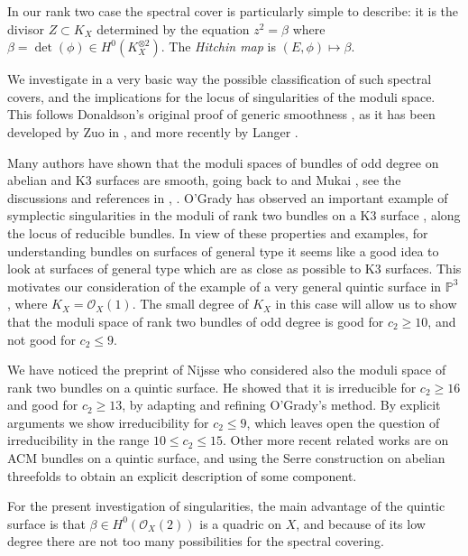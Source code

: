 \documentclass{amsart}
\theoremstyle{plain}
\numberwithin{equation}{section}
\begin{document}
In our rank two case the spectral cover is
particularly simple to describe: it is the divisor $Z\subset K_X$ determined by the
equation $z^2 = \beta$ where $\beta = \det (\phi )\in H^0(K_X^{\otimes 2})$. 
The {\em Hitchin map} is $(E,\phi )\mapsto \beta$. 

We investigate in a very basic way the possible classification of such spectral covers,
and the implications for the locus of singularities of the moduli space. This follows
Donaldson's original proof of generic smoothness \cite{Donaldson}, as it has been
developed by Zuo in \cite{Zuo}, and more recently by Langer \cite{Langer}. 

Many authors have shown that the moduli spaces of bundles of odd degree on
abelian and K3 surfaces are smooth, going back to \cite{ElencwajgForster} and
Mukai \cite{Mukai}, see the discussions and references in \cite{YoshiokaAbelian}, \cite{YoshiokaK3}. 
O'Grady has observed an important example of symplectic singularities in the moduli of
rank two bundles on a K3 surface \cite{OGradyK3}, along the locus of reducible bundles.
In view of these properties and examples, for understanding bundles on surfaces of
general type it seems like a good idea to look at surfaces of general type which are
as close as possible to K3 surfaces. This motivates our consideration of the example
of a very general quintic surface in ${{\mathbb P}} ^3$, where $K_X={{\mathcal O}} _X(1)$. 
The small degree of $K_X$ in this case will allow us to show that the moduli space 
of rank two bundles of
odd degree is good
for $c_2\geq 10$, and not good for $c_2\leq 9$. 

We have noticed the preprint of Nijsse \cite{Nijsse} who considered also the moduli space
of rank two bundles on a quintic surface. He showed that it is irreducible for $c_2\geq 16$ and
good for $c_2\geq 13$, by adapting and refining O'Grady's method.  By explicit 
arguments we show irreducibility for $c_2\leq 9$, which leaves open the
question of irreducibility 
in the range $10\leq c_2\leq 15$. Other more recent related works are \cite{ChiantiniFaenzi} on ACM bundles on a quintic surface, and \cite{Gulbrandsen} using the Serre construction on abelian threefolds to obtain an explicit description of some component. 

For the present investigation of singularities, the main advantage of the quintic surface  
is that $\beta \in H^0({{\mathcal O}} _X(2))$ is a quadric
on $X$, and because of its low degree there are not too many possibilities
for the spectral covering. 
\end{document}
